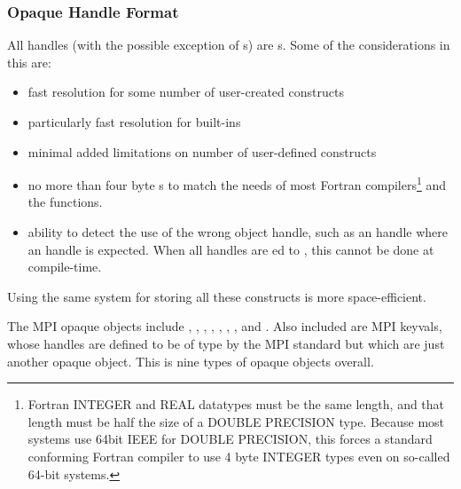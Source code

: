 \documentclass{article}
\begin{document}
\subsubsection{Opaque Handle Format}
All handles (with the possible exception of s) are
s.  Some of the considerations in this are:
\begin{itemize}
\item fast resolution for some number of user-created constructs
\item particularly fast resolution for built-ins
\item minimal added limitations on number of user-defined constructs 
\item no more than four byte s to match the needs of most
Fortran compilers\footnote{Fortran INTEGER and REAL datatypes must be
the same length, and that length must be half the size of a DOUBLE
PRECISION type.  Because most systems use 64bit IEEE for DOUBLE
PRECISION, this forces a standard conforming Fortran compiler to use 4
byte INTEGER types even on so-called 64-bit systems.} and the
 functions. 
\item ability to detect the use of the wrong object handle, such as an
 handle where an  handle is
expected.  When all handles are ed to , this
cannot be done at compile-time.
\end{itemize}

Using the same system for storing all these constructs is more
space-efficient.

The MPI opaque objects include , ,
, , ,
, , and .  
Also included are MPI keyvals, whose handles are defined to be of type
 by the MPI standard but which are just another opaque
object.
This is nine types of opaque objects overall.


\end{document}
